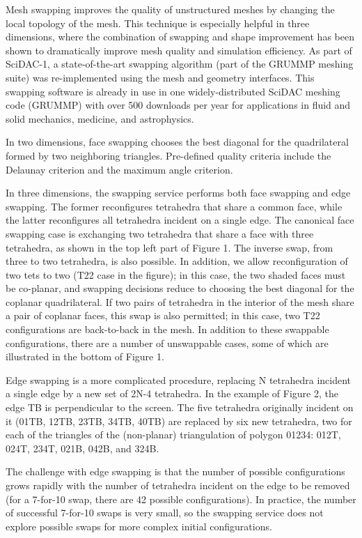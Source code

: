 Mesh swapping improves the quality of unstructured meshes by changing the local topology of the mesh. This technique is especially helpful in three dimensions, where the combination of swapping and shape improvement has been shown to dramatically improve mesh quality and simulation efficiency. As part of SciDAC-\/1, a state-\/of-\/the-\/art swapping algorithm (part of the GRUMMP meshing suite) was re-\/implemented using the mesh and geometry interfaces. This swapping software is already in use in one widely-\/distributed SciDAC meshing code (GRUMMP) with over 500 downloads per year for applications in fluid and solid mechanics, medicine, and astrophysics.

In two dimensions, face swapping chooses the best diagonal for the quadrilateral formed by two neighboring triangles. Pre-\/defined quality criteria include the Delaunay criterion and the maximum angle criterion.

In three dimensions, the swapping service performs both face swapping and edge swapping. The former reconfigures tetrahedra that share a common face, while the latter reconfigures all tetrahedra incident on a single edge. The canonical face swapping case is exchanging two tetrahedra that share a face with three tetrahedra, as shown in the top left part of Figure 1. The inverse swap, from three to two tetrahedra, is also possible. In addition, we allow reconfiguration of two tets to two (T22 case in the figure); in this case, the two shaded faces must be co-\/planar, and swapping decisions reduce to choosing the best diagonal for the coplanar quadrilateral. If two pairs of tetrahedra in the interior of the mesh share a pair of coplanar faces, this swap is also permitted; in this case, two T22 configurations are back-\/to-\/back in the mesh. In addition to these swappable configurations, there are a number of unswappable cases, some of which are illustrated in the bottom of Figure 1.

 Edge swapping is a more complicated procedure, replacing N tetrahedra incident a single edge by a new set of 2N-\/4 tetrahedra. In the example of Figure 2, the edge TB is perpendicular to the screen. The five tetrahedra originally incident on it (01TB, 12TB, 23TB, 34TB, 40TB) are replaced by six new tetrahedra, two for each of the triangles of the (non-\/planar) triangulation of polygon 01234: 012T, 024T, 234T, 021B, 042B, and 324B.

 The challenge with edge swapping is that the number of possible configurations grows rapidly with the number of tetrahedra incident on the edge to be removed (for a 7-\/for-\/10 swap, there are 42 possible configurations). In practice, the number of successful 7-\/for-\/10 swaps is very small, so the swapping service does not explore possible swaps for more complex initial configurations.

